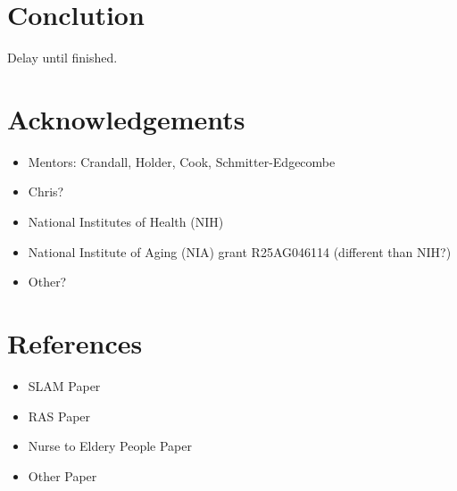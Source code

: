 \documentclass[11pt, draft, a4paper]{IEEEtran}
\begin{document}
\section{Conclution}
Delay until finished.


\section{Acknowledgements}
\begin{itemize}
    \item Mentors: Crandall, Holder, Cook, Schmitter-Edgecombe
    \item Chris?
    \item National Institutes of Health (NIH)
    \item National Institute of Aging (NIA) grant R25AG046114  (different than NIH?)
    \item Other?
\end{itemize}


\section{References}
\begin{itemize}
    \item SLAM Paper
    \item RAS Paper
    \item Nurse to Eldery People Paper
    \item Other Paper
\end{itemize}
\end{document}
